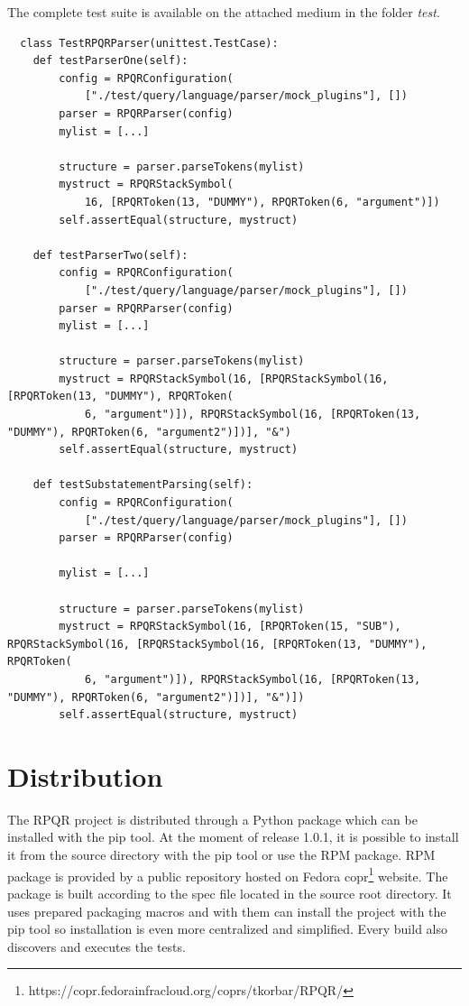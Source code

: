 The complete test suite is available on the attached medium in the folder \textit{test}.

\newpage

\begin{lstlisting}
  class TestRPQRParser(unittest.TestCase):
    def testParserOne(self):
        config = RPQRConfiguration(
            ["./test/query/language/parser/mock_plugins"], [])
        parser = RPQRParser(config)
        mylist = [...]

        structure = parser.parseTokens(mylist)
        mystruct = RPQRStackSymbol(
            16, [RPQRToken(13, "DUMMY"), RPQRToken(6, "argument")])
        self.assertEqual(structure, mystruct)

    def testParserTwo(self):
        config = RPQRConfiguration(
            ["./test/query/language/parser/mock_plugins"], [])
        parser = RPQRParser(config)
        mylist = [...]

        structure = parser.parseTokens(mylist)
        mystruct = RPQRStackSymbol(16, [RPQRStackSymbol(16, [RPQRToken(13, "DUMMY"), RPQRToken(
            6, "argument")]), RPQRStackSymbol(16, [RPQRToken(13, "DUMMY"), RPQRToken(6, "argument2")])], "&")
        self.assertEqual(structure, mystruct)

    def testSubstatementParsing(self):
        config = RPQRConfiguration(
            ["./test/query/language/parser/mock_plugins"], [])
        parser = RPQRParser(config)

        mylist = [...]

        structure = parser.parseTokens(mylist)
        mystruct = RPQRStackSymbol(16, [RPQRToken(15, "SUB"), RPQRStackSymbol(16, [RPQRStackSymbol(16, [RPQRToken(13, "DUMMY"), RPQRToken(
            6, "argument")]), RPQRStackSymbol(16, [RPQRToken(13, "DUMMY"), RPQRToken(6, "argument2")])], "&")])
        self.assertEqual(structure, mystruct)
\end{lstlisting}

\newpage

\section{Distribution}

The RPQR project is distributed through a Python package which can be installed with the pip\cite{pip} tool.
At the moment of release 1.0.1, it is possible to install it from the source directory with the pip
tool or use the RPM package. RPM package is provided by a public repository hosted on Fedora copr\footnote{https://copr.fedorainfracloud.org/coprs/tkorbar/RPQR/}
website. The package is built according to the spec file located in the source root directory.
It uses prepared packaging macros and with them can install the project with the pip tool so
installation is even more centralized and simplified. Every build also discovers and executes the tests.

